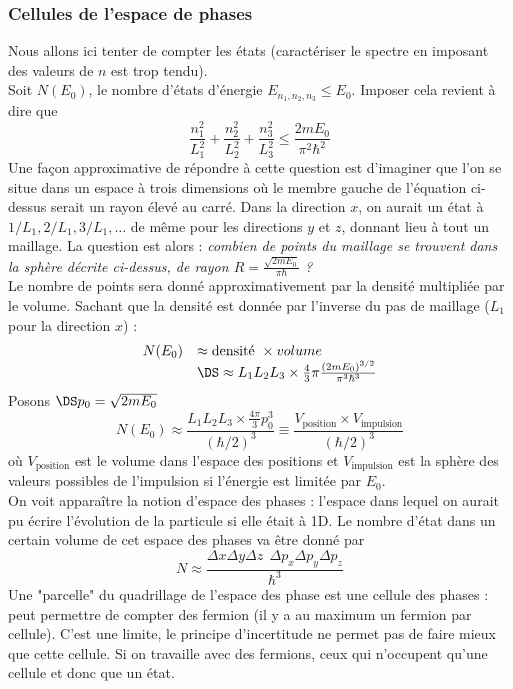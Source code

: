 		
		\subsubsection{Cellules de l'espace de phases}
		Nous allons ici tenter de compter les états (caractériser le spectre en imposant des	valeurs de 
		$n$ est trop tendu).\\
		
		Soit $N(E_0)$, le nombre d'états d'énergie $E_{n_1,n_2,n_3} \leq E_0$. Imposer cela revient à dire 
		que
		\begin{equation}
		\dfrac{n_1^2}{L_1^2}+\dfrac{n_2^2}{L_2^2}+	\dfrac{n_3^2}{L_3^2} \leq \dfrac{2mE_0}{\pi^2\hbar^2}
		\end{equation}
		Une façon approximative de répondre à cette question est d'imaginer que l'on se situe dans un 
		espace à trois dimensions où le membre gauche de l'équation ci-dessus serait un rayon élevé au 
		carré. Dans la direction $x$, on aurait un état à $1/L_1, 2/L_1, 3/L_1,\dots$ de même pour les 
		directions $y$ et $z$, donnant lieu à tout un maillage. La question est alors : \textit{combien 
		de points du maillage se trouvent dans la sphère décrite ci-dessus, de rayon $R=\frac{\sqrt{2mE_0}}{
		\pi\hbar}$ ?}\\
				
		Le nombre de points sera donné approximativement par la densité multipliée par le volume. Sachant 
		que la densité est donnée par l'inverse du pas de maillage ($L_1$ pour la direction $x$) :
		\begin{equation}
		\begin{array}{ll}
		N(E_0) &\approx \text{densité }\times{ volume}\\
		&\DS\approx L_1L_2L_3 \times \frac{4}{3}\pi\frac{(2mE_0)^{3/2}}{\pi^3\hbar^3}
		\end{array}
		\end{equation}
		Posons $\DS p_0 = \sqrt{2mE_0}$
		\begin{equation}
		N(E_0) \approx \dfrac{L_1L_2L_3\times\frac{4\pi}{3}p_0^3}{(\hbar/2)^3} \equiv \dfrac{V_{\text{position}}
		\times V_{\text{impulsion}}}{(\hbar/2)^3}
		\end{equation}
		où $V_{\text{position}}$ est le volume dans l'espace des positions et $V_{\text{impulsion}}$ est 
		la sphère des valeurs possibles de l'impulsion si l'énergie est limitée par $E_0$.\\
				
		On voit apparaître la notion d'espace des phases : l'espace dans lequel on aurait pu écrire 
		l'évolution de la particule si elle était à 1D. Le nombre d'état dans un certain volume de 
		cet espace des phases va être donné par
		\begin{equation}
		N \approx \dfrac{\Delta x\Delta y\Delta z\ \ \Delta p_x\Delta p_y\Delta p_z}{\hbar^3}
		\end{equation}
		Une "parcelle" du quadrillage de l'espace des phase est une cellule des phases : peut permettre 
		de compter des fermion (il y a au maximum un fermion par cellule). C'est une limite, le principe
		d'incertitude ne permet pas de faire mieux que cette cellule. Si on travaille avec des fermions, 
		ceux qui n'occupent qu'une cellule et donc que un état.
		
